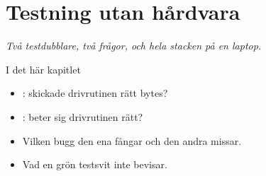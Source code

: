 \chapter{Testning utan hårdvara}
\label{ch:testning}


{\large\itshape Två testdubblare, två frågor, och hela stacken på en laptop.\par}

\begin{chapterbox}{I det här kapitlet}
\begin{itemize}
  \item {}: skickade drivrutinen rätt bytes?
  \item {}: beter sig drivrutinen rätt?
  \item Vilken bugg den ena fångar och den andra missar.
  \item Vad en grön testsvit inte bevisar.
\end{itemize}
\end{chapterbox}




